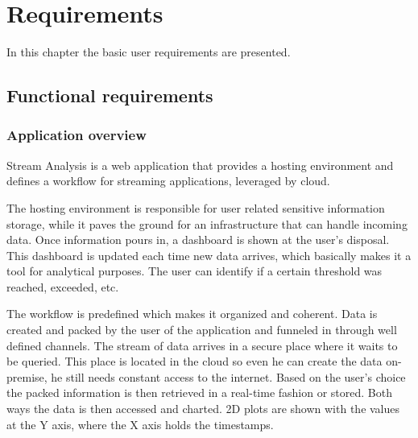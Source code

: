 \chapter{Requirements}
\label{chap:02}
In this chapter the basic user requirements are presented.

\section{Functional requirements}
\label{chap:02:02}

\subsection{Application overview}
\label{chap:02:02:01}
Stream Analysis is a web application that provides a hosting environment and defines a workflow for streaming applications, leveraged by cloud.

The hosting environment is responsible for user related sensitive information storage, while it paves the ground for an infrastructure that can handle incoming data. Once information pours in, a dashboard is shown at the user's disposal. This dashboard is updated each time new data arrives, which basically makes it a tool for analytical purposes. The user can identify if a certain threshold was reached, exceeded, etc. 

The workflow is predefined which makes it organized and coherent. Data is created and packed by the user of the application and funneled in through well defined channels. The stream of data arrives in a secure place where it waits to be queried. This place is located in the cloud so even he can create the data on-premise, he still needs constant access to the internet. Based on the user's choice the packed information is then retrieved in a real-time fashion or stored. Both ways the data is then accessed and charted. 2D plots are shown with the values at the Y axis, where the X axis holds the timestamps.

